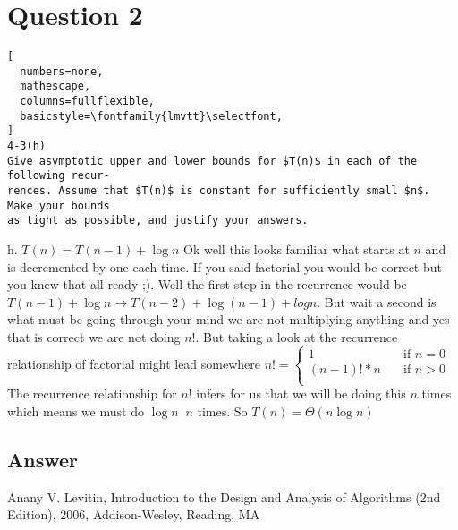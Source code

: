 \documentclass{article}
\begin{document}
\newpage
\clearpage
\section*{Question 2}
\begin{lstlisting}[
  numbers=none,
  mathescape,
  columns=fullflexible,
  basicstyle=\fontfamily{lmvtt}\selectfont,
]
4-3(h)
Give asymptotic upper and lower bounds for $T(n)$ in each of the following recur-
rences. Assume that $T(n)$ is constant for sufficiently small $n$. Make your bounds
as tight as possible, and justify your answers.
\end{lstlisting}
h. $T(n)=T(n-1)+\log n$ Ok well this looks familiar what starts at $n$ and is decremented by one each time.  If you said factorial you would be correct but you knew that all ready ;).  \newline
Well the first step in the recurrence would be $T(n-1)+\log n \to T(n-2) + \log(n-1) + log n$. But wait a second is what must be going through your mind we are not multiplying anything and yes that is correct we are not doing $\displaystyle n!$. But taking a look at the recurrence relationship of factorial might lead somewhere 
$n!=\begin{cases}
  1       & \quad \text{if } n=0\\
   (n-1)!*n & \quad \text{if } n > 0\\
\end{cases}$
The recurrence relationship for $n!$ infers for us that we will be doing this $n$ times which means we must do $\log n \ $ $n$ times. So $T(n)=\Theta(n \log n)$ 
\newpage
\clearpage
\subsection*{Answer}
\begin{thebibliography}{9}

   Anany V. Levitin,
  Introduction to the Design and Analysis of Algorithms (2nd Edition),
  2006,
  Addison-Wesley,
 Reading, MA

\end{thebibliography} 
\end{document}
